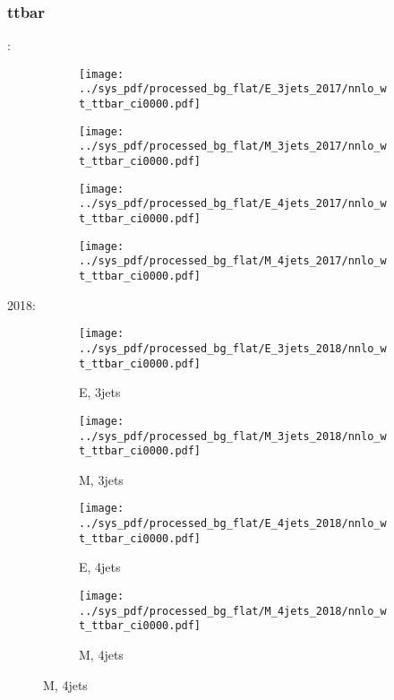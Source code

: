 \documentclass{beamer}
\begin{document}
\begin{frame}
\frametitle{ttbar}
\fontsize{5}{1}:
\begin{figure}
\centering
\begin{subfigure}[b]{0.24\textwidth}
\texttt{[image: ../sys\_pdf/processed\_bg\_flat/E\_3jets\_2017/nnlo\_wt\_ttbar\_ci0000.pdf]}
\end{subfigure}
\begin{subfigure}[b]{0.24\textwidth}
\texttt{[image: ../sys\_pdf/processed\_bg\_flat/M\_3jets\_2017/nnlo\_wt\_ttbar\_ci0000.pdf]}
\end{subfigure}
\begin{subfigure}[b]{0.24\textwidth}
\texttt{[image: ../sys\_pdf/processed\_bg\_flat/E\_4jets\_2017/nnlo\_wt\_ttbar\_ci0000.pdf]}
\end{subfigure}
\begin{subfigure}[b]{0.24\textwidth}
\texttt{[image: ../sys\_pdf/processed\_bg\_flat/M\_4jets\_2017/nnlo\_wt\_ttbar\_ci0000.pdf]}
\end{subfigure}
\end{figure}
2018:
\begin{figure}
\centering
\begin{subfigure}[b]{0.24\textwidth}
\texttt{[image: ../sys\_pdf/processed\_bg\_flat/E\_3jets\_2018/nnlo\_wt\_ttbar\_ci0000.pdf]}
\captionsetup{font=tiny}
\caption{E, 3jets}
\end{subfigure}
\begin{subfigure}[b]{0.24\textwidth}
\texttt{[image: ../sys\_pdf/processed\_bg\_flat/M\_3jets\_2018/nnlo\_wt\_ttbar\_ci0000.pdf]}
\captionsetup{font=tiny}
\caption{M, 3jets}
\end{subfigure}
\begin{subfigure}[b]{0.24\textwidth}
\texttt{[image: ../sys\_pdf/processed\_bg\_flat/E\_4jets\_2018/nnlo\_wt\_ttbar\_ci0000.pdf]}
\captionsetup{font=tiny}
\caption{E, 4jets}
\end{subfigure}
\begin{subfigure}[b]{0.24\textwidth}
\texttt{[image: ../sys\_pdf/processed\_bg\_flat/M\_4jets\_2018/nnlo\_wt\_ttbar\_ci0000.pdf]}
\captionsetup{font=tiny}
\caption{M, 4jets}
\end{subfigure}
\end{figure}
\end{frame}
\end{document}
